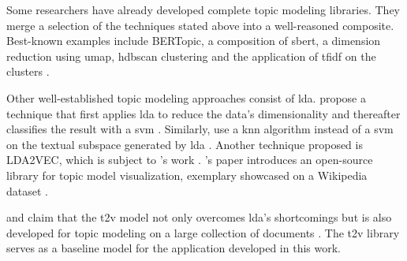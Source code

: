 
Some researchers have already developed complete topic modeling libraries.
They merge a selection of the techniques stated above into a well-reasoned composite.
Best-known examples include BERTopic, a composition of \ac{sbert}, a dimension reduction using \ac{umap}, \ac{hdbscan} clustering and the application of \ac{tfidf} on the clusters \cite{bertopic2022}.

Other well-established topic modeling approaches consist of \ac{lda}.
\citeauthor{lda2008} propose a technique that first applies \ac{lda} to reduce the data's dimensionality and thereafter classifies the result with a \ac{svm} \cite{lda2008}.
Similarly, \citeauthor{LDA2016} use a \ac{knn} algorithm instead of a \ac{svm} on the textual subspace generated by \ac{lda} \cite{LDA2016}.
Another technique proposed is LDA2VEC, which is subject to \citeauthor{evolution_of_topic_modeling2022}'s work \cite{evolution_of_topic_modeling2022}.
\citeauthor{topic_modeling2021}'s paper introduces an open-source library for topic model visualization, exemplary showcased on a Wikipedia dataset \cite{topic_modeling2021}.

\citeauthor{Top2Vec2020} and \citeauthor{Topic2Vec2015} claim that the \ac{t2v} model not only overcomes \ac{lda}'s shortcomings \cite{Top2Vec2020, Topic2Vec2015}
but is also developed for topic modeling on a large collection of documents \cite{Top2Vec2020}.
The \ac{t2v} library serves as a baseline model for the application developed in this work.